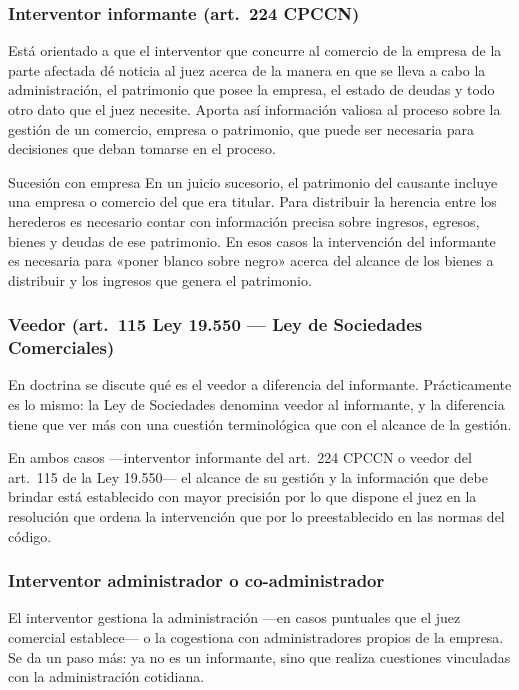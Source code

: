 \documentclass[12pt,oneside]{book}
\begin{document}
\subsubsection{Interventor informante (art.\ 224 CPCCN)}

Está orientado a que el interventor que concurre al comercio de la empresa de la parte afectada dé noticia al juez acerca de la manera en que se lleva a cabo la administración, el patrimonio que posee la empresa, el estado de deudas y todo otro dato que el juez necesite. Aporta así información valiosa al proceso sobre la gestión de un comercio, empresa o patrimonio, que puede ser necesaria para decisiones que deban tomarse en el proceso.

\begin{example}{Sucesión con empresa}
En un juicio sucesorio, el patrimonio del causante incluye una empresa o comercio del que era titular. Para distribuir la herencia entre los herederos es necesario contar con información precisa sobre ingresos, egresos, bienes y deudas de ese patrimonio. En esos casos la intervención del informante es necesaria para «poner blanco sobre negro» acerca del alcance de los bienes a distribuir y los ingresos que genera el patrimonio.
\end{example}

\subsubsection{Veedor (art.\ 115 Ley 19.550 --- Ley de Sociedades Comerciales)}

En doctrina se discute qué es el veedor a diferencia del informante. Prácticamente es lo mismo: la Ley de Sociedades denomina veedor al informante, y la diferencia tiene que ver más con una cuestión terminológica que con el alcance de la gestión.

En ambos casos ---interventor informante del art.\ 224 CPCCN o veedor del art.\ 115 de la Ley 19.550--- el alcance de su gestión y la información que debe brindar está establecido con mayor precisión por lo que dispone el juez en la resolución que ordena la intervención que por lo preestablecido en las normas del código.

\subsubsection{Interventor administrador o co-administrador}

El interventor gestiona la administración ---en casos puntuales que el juez comercial establece--- o la cogestiona con administradores propios de la empresa. Se da un paso más: ya no es un informante, sino que realiza cuestiones vinculadas con la administración cotidiana.
\end{document}
